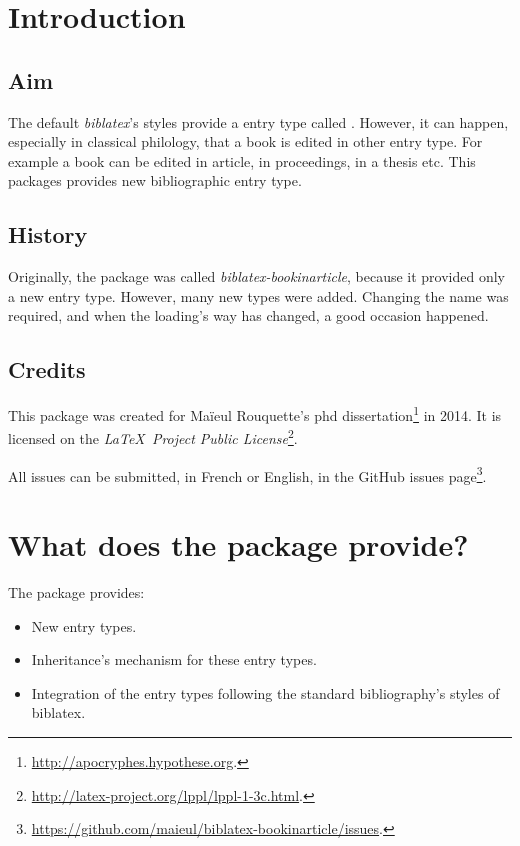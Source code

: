 \documentclass{ltxdockit}[2011/03/25]
\newcommand{\biblatex}{\emph{biblatex}\xspace}
\begin{document}
\printtitlepage
\tableofcontents

\section{Introduction}

\subsection{Aim}
The default \biblatex's styles provide a entry type called . 
However, it can happen, especially in classical philology, that a book is edited in other entry type. 
For example a book can be edited in article, in proceedings, in a thesis etc.
This packages provides new bibliographic entry type.

\subsection{History}

Originally, the package was called \emph{biblatex-bookinarticle}, because it provided only a new  entry type. 
However, many new types were added. 
Changing the name was required, and when the loading's way has changed, a good occasion happened.
\subsection{Credits}

This package was created for Maïeul Rouquette's phd dissertation\footnote{\url{http://apocryphes.hypothese.org}.} in 2014. It is licensed on the \emph{\LaTeX\ Project Public License}\footnote{\url{http://latex-project.org/lppl/lppl-1-3c.html}.}. 


All issues can be submitted, in French or English, in the GitHub issues page\footnote{\url{https://github.com/maieul/biblatex-bookinarticle/issues}.}.


\section{What does the package provide?}

The package provides:
\begin{itemize}
  \item New entry types. 
  \item Inheritance's mechanism for these entry types. 
  \item Integration of the entry types following the standard bibliography's styles of biblatex. 
\end{itemize}
\end{document}
